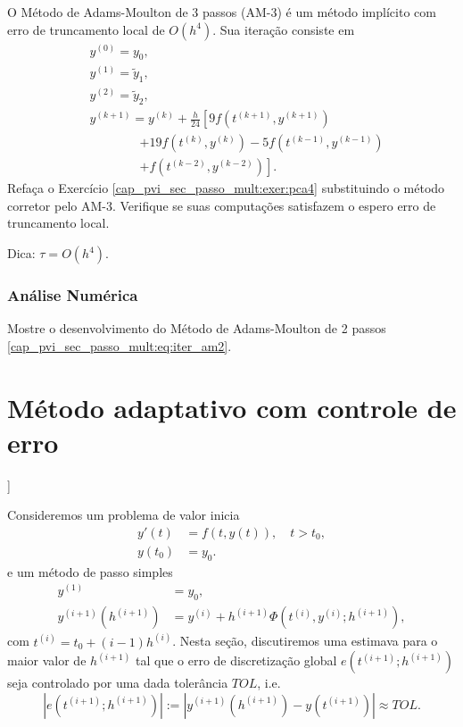 \begin{exer}
  O Método de Adams-Moulton de 3 passos (AM-3) é um método implícito com erro de truncamento local de $O(h^4)$. Sua iteração consiste em
  \begin{equation}
    \begin{aligned}
      &y^{(0)} = y_0,\\
      &y^{(1)} = \tilde{y}_1,\\
      &y^{(2)} = \tilde{y}_2,\\
      &y^{(k+1)} = y^{(k)} + \frac{h}{24}\left[9f\left(t^{(k+1)},y^{(k+1)}\right) \right.\\
    &\qquad\qquad\left. + 19f\left(t^{(k)},y^{(k)}\right) - 5f\left(t^{(k-1)},y^{(k-1)}\right) \right. \\
    &\qquad\qquad\left. + f\left(t^{(k-2)},y^{(k-2)}\right)\right].      
  \end{aligned}
  \end{equation}
  Refaça o Exercício \ref{cap_pvi_sec_passo_mult:exer:pca4} substituindo o método corretor pelo AM-3. Verifique se suas computações satisfazem o espero erro de truncamento local.
\end{exer}
\begin{resp}
  Dica: $\tau = O(h^4)$.
\end{resp}

\subsubsection{Análise Numérica}

\begin{exer}\label{cap_pvi_sec_passo_mult:exer:am2}
  Mostre o desenvolvimento do Método de Adams-Moulton de 2 passos \eqref{cap_pvi_sec_passo_mult:eq:iter_am2}.
\end{exer}

\section{Método adaptativo com controle de erro}\label{cap_pvi_met_adap}

\begin{flushleft}
  [[tag:revisar]]
\end{flushleft}

Consideremos um problema de valor inicia
\begin{align}
  y'(t) &= f(t,y(t)),\quad t>t_0,\\
  y(t_0) &= y_0.
\end{align}
e um método de passo simples
\begin{align}
  y^{(1)} &= y_0,\\
  y^{(i+1)}(h^{(i+1)}) &= y^{(i)} + h^{(i+1)}\Phi(t^{(i)},y^{(i)};h^{(i+1)}),
\end{align}
com $t^{(i)} = t_0 + (i-1)h^{(i)}$. Nesta seção, discutiremos uma estimava para o maior valor de $h^{(i+1)}$ tal que o erro de discretização global $e(t^{(i+1)};h^{(i+1)})$ seja controlado por uma dada tolerância $TOL$, i.e.
\begin{equation}\label{eq:pvi_erro_aux1}
  |e(t^{(i+1)};h^{(i+1)})| := |y^{(i+1)}(h^{(i+1)}) - y(t^{(i+1)})| \approx TOL.
\end{equation}

